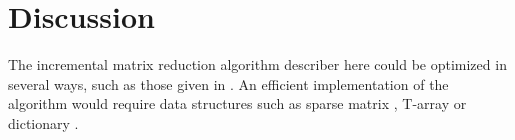 \documentclass[11pt]{article}
\begin{document}
\section{Discussion}

The incremental matrix reduction algorithm describer here could be optimized in several ways, such 
as those given in \cite{kerber-18}.  An efficient implementation of the algorithm would require 
data structures such as sparse matrix \cite{edelsbrunner-10}, T-array \cite{zomorodian-05} or 
dictionary \cite{kerber-18}.




\end{document}
